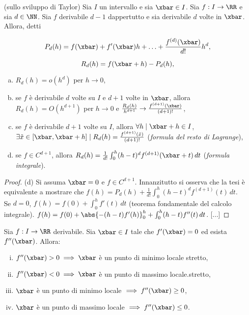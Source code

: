 \documentclass[11pt]{article}
\begin{document}
	\begin{theorem} (sullo sviluppo di Taylor)
		Sia $I$ un intervallo e sia $\xbar \in I$. Sia $f : I \to \RR$ e
		sia $d \in \NN$. Sia $f$ derivabile $d-1$ dappertutto e sia derivabile
		$d$ volte in $\xbar$. Allora, detti
		
		\[ P_d(h) = f(\xbar) + f'(\xbar) h + \ldots + \frac{f^{(d)}(\xbar)}{d!} h^d, \]
		
		\[ R_d(h) = f(\xbar + h) - P_d(h), \]
		
		\begin{enumerate}[(a)]
			\item $R_d(h) = o(h^d)$ per $h \to 0$,
			
			\item se $f$ è derivabile $d$ volte su $I$ e $d+1$ volte in $\xbar$, allora $R_d(h) = O(h^{d+1})$ per $h \to 0$ e $\frac{R_d(h)}{h^{d+1}} \to \frac{f^{(d+1)}(\xbar)}{(d+1)!}$,
			
			\item se $f$ è derivabile $d+1$ volte su $I$, allora
			$\forall h \mid \xbar + h \in I$, $\exists \tilde x \in [\xbar, \xbar + h] \mid R_d(h) = \frac{f^{(d+1)}(\tilde x)}{(d+1)!}$ (\textit{formula del resto di Lagrange}),
			
			\item se $f \in C^{d+1}$, allora $R_d(h) = \frac{1}{d!} \int_0^h (h-t)^d f^{(d+1)}(\xbar + t) \, dt$ (\textit{formula integrale}).
		\end{enumerate}
	\end{theorem}

	\begin{proof} %
		(d) Si assuma $\xbar = 0$ e $f \in C^{d+1}$. Innanzitutto
		si osserva che la tesi è equivalente a mostrare che $f(h) = P_d(h) + \frac{1}{d!} \int_0^h (h-t)^d f^{(d+1)}(t) \, dt$. \\
		
		Se $d=0$, $f(h) = f(0) + \int_0^h f'(t) \,dt$ (teorema fondamentale
		del calcolo integrale). $f(h) = f(0) + \abs{-(h-t) f'(h)}_0^h + \int_0^h (h-t) f''(t) \, dt$. [...] %
	\end{proof}

	\begin{proposition}
		Sia $f : I \to \RR$ derivabile. Sia $\xbar \in I$ tale che
		$f'(\xbar) = 0$ ed esista $f''(\xbar)$. Allora:
		
		\begin{enumerate}[(i)]
			\item $f''(\xbar) > 0 \implies \xbar$ è un punto di minimo locale stretto,
			\item $f''(\xbar) < 0 \implies \xbar$ è un punto di massimo locale.stretto,
			\item $\xbar$ è un punto di minimo locale $\implies f''(\xbar) \geq 0$,
			\item $\xbar$ è un punto di massimo locale $\implies f''(\xbar) \leq 0$. 
		\end{enumerate}
	\end{proposition}
\end{document}
